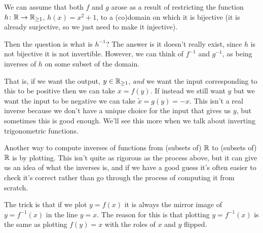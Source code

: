 \documentclass[fleqn]{LectureClass/LectureClass}
\begin{document}
\begin{exm}{}{}
        We can assume that both \(f\) and \(g\) arose as a result of restricting the function \(h \colon \mathbb{R} \to \mathbb{R}_{\ge 1}\), \(h(x) = x^2 + 1\), to a (co)domain on which it is bijective (it is already surjective, so we just need to make it injective).
        
        Then the question is what is \(h^{-1}\)?
        The answer is it doesn't really exist, since \(h\) is not bijective it is not invertible.
        However, we can think of \(f^{-1}\) and \(g^{-1}\), as being inverses of \(h\) on some subset of the domain.
        
        That is, if we want the output, \(y \in \mathbb{R}_{\ge 1}\), \emph{and} we want the input corresponding to this to be positive then we can take \(x = f(y)\).
        If instead we still want \(y\) but we want the input to be negative we can take \(\tilde{x} = g(y) = -x\).
        This isn't a real inverse because we don't have a unique choice for the input that gives us \(y\), but sometimes this is good enough.
        We'll see this more when we talk about inverting trigonometric functions.
    \end{exm}
    
    Another way to compute inverses of functions from (subsets of) \(\mathbb{R}\) to (subsets of) \(\mathbb{R}\) is by plotting.
    This isn't quite as rigorous as the process above, but it can give us an idea of what the inverses is, and if we have a good guess it's often easier to check it's correct rather than go through the process of computing it from scratch.
    
    The trick is that if we plot \(y = f(x)\) it is always the mirror image of \(y = f^{-1}(x)\) in the line \(y = x\).
    The reason for this is that plotting \(y = f^{-1}(x)\) is the same as plotting \(f(y) = x\) with the roles of \(x\) and \(y\) flipped.
    
\end{document}
